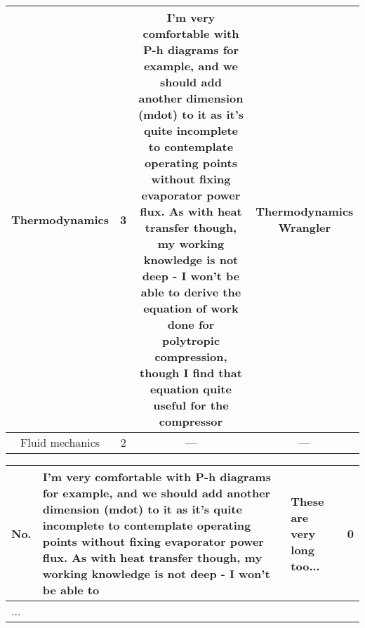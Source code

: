 \documentclass[11pt, oneside]{article}   	%
\begin{document}
\begin{center}
\begin{tabular}{||c c c c||}
\hline
Thermodynamics & 3 & I'm very comfortable with P-h diagrams for example, and we should add another dimension (mdot) to it as it's quite incomplete to contemplate operating points without fixing evaporator power flux. As with heat transfer though, my working knowledge is not deep - I won't be able to derive the equation of work done for polytropic compression, though I find that equation quite useful for the compressor & Thermodynamics Wrangler \\
\hline
Fluid mechanics & 2 & --- & --- \\
\hline

\end{tabular}
\end{center}

\begin{tabularx}{\textwidth}{l X X l}
\hline
No. & I'm very comfortable with P-h diagrams for example, and we should add another dimension (mdot) to it as it's quite incomplete to contemplate operating points without fixing evaporator power flux. As with heat transfer though, my working knowledge is not deep - I won't be able to
    & These are very long too... 
    & 0\\
\hline
...
\end{tabularx}
\end{document}
